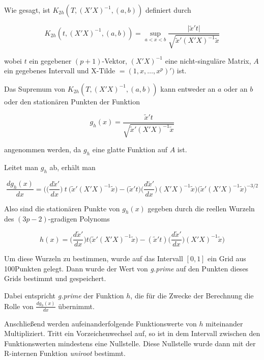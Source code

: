 \documentclass[12pt,a4paper]{article}
\theoremstyle{definition}
\theoremstyle{definition}
\theoremstyle{definition}
\theoremstyle{definition}
\newcommand{\ngridpoly}{100}
\begin{document}
Wie gesagt, ist $K_{2h}(T,(X'X)^{-1},(a,b))$ definiert durch

\begin{equation*}
K_{2h}(t,(X'X)^{-1},(a,b)) = \sup_{a<x<b} \frac{\vert \tilde{x}' t \vert}{\sqrt{\tilde{x}'(X'X)^{-1}\tilde{x}}}
\end{equation*}

wobei $t$ ein gegebener $(p+1)$-Vektor, $(X'X)^{-1}$ eine nicht-singuläre Matrix, $A$ ein gegebenes Intervall und \gls{X-Tilde} $= (1, x, \ldots, x^p)')$ ist. 

Das Supremum von $K_{2h}(T,(X'X)^{-1},(a,b))$ kann entweder an $a$ oder an $b$ oder den stationären Punkten der Funktion

\begin{equation*}
g_h(x) = \frac{\tilde{x}'t}{\sqrt{\tilde{x}'(X'X)^{-1}\tilde{x}}}
\end{equation*}

angenommen werden, da $g_h$ eine glatte Funktion auf $A$ ist.

Leitet man $g_h$ ab, erhält man

\begin{equation*}
\frac{d g_h(x)}{dx} = \bigg ( \big ( \frac{d\tilde{x}'}{dx} \big) ~ t ~ \big ( \tilde{x}'(X'X)^{-1}\tilde{x} \big ) - \big ( \tilde{x}'t \big ) \big ( \frac{d\tilde{x}'}{dx} \big ) (X'X)^{-1} \tilde{x} \bigg ) \bigg ( \tilde{x}'(X'X)^{-1}\tilde{x} \bigg )^{-3/2}
\end{equation*}

Also sind die stationären Punkte von $g_h(x)$ gegeben durch die reellen Wurzeln des $(3p-2)$-gradigen Polynoms

\begin{equation*}
h(x) = \big(\frac{d\tilde{x}'}{dx}\big) t \big( \tilde{x}'(X'X)^{-1}\tilde{x} \big) - (\tilde{x}'t) \big(\frac{d\tilde{x}'}{dx}\big) (X'X)^{-1} \tilde{x})
\end{equation*}

Um diese Wurzeln zu bestimmen, wurde auf das Intervall $[0,1]$ ein Grid aus \ngridpoly Punkten gelegt. Dann wurde der Wert von \textit{g.prime} auf den Punkten dieses Grids bestimmt und gespeichert. 

Dabei entspricht \textit{g.prime} der Funktion $h$, die für die Zwecke der Berechnung die Rolle von $\frac{d g_h(x)}{dx}$ übernimmt.

Anschließend werden aufeinanderfolgende Funktionswerte von $h$ miteinander Multipliziert. Tritt ein Vorzeichenwechsel auf, so ist in dem Intervall zwischen den Funktionswerten mindestens eine Nullstelle. Diese Nullstelle wurde dann mit der R-internen Funktion \textit{uniroot} bestimmt.
\end{document}
